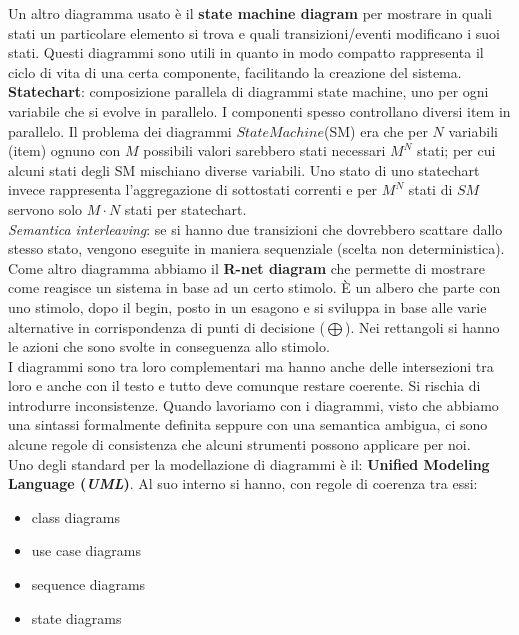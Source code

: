 Un altro diagramma usato è il \textbf{state machine diagram} per mostrare in quali stati un particolare elemento si trova e quali transizioni/eventi modificano i suoi stati. Questi diagrammi sono utili in quanto in modo compatto rappresenta il ciclo di vita di una certa componente, facilitando la creazione del sistema. \\

\textbf{Statechart}: composizione parallela di diagrammi state machine, uno per ogni variabile che si evolve in parallelo. I componenti spesso controllano diversi item in parallelo. Il problema dei diagrammi $StateMachine$(SM) era che per $N$ variabili (item) ognuno con $M$ possibili valori sarebbero stati necessari $M^N$ stati; per cui alcuni stati degli SM mischiano diverse variabili. Uno stato di uno statechart invece rappresenta l’aggregazione di sottostati correnti e per $M^N$ stati di $SM$ servono solo $M \cdot N$ stati per statechart.\\
\textit{Semantica interleaving}: se si hanno due transizioni che dovrebbero scattare dallo stesso stato, vengono eseguite in maniera sequenziale (scelta non deterministica).\\

Come altro diagramma abbiamo il \textbf{R-net diagram} che permette di mostrare come reagisce un sistema in base ad un certo stimolo. È un albero che parte con uno stimolo, dopo il begin, posto in un esagono e si sviluppa in base alle varie alternative in corrispondenza di punti di decisione ($\bigoplus$). Nei rettangoli si hanno le azioni che sono svolte in conseguenza allo stimolo.\\

I diagrammi sono tra loro complementari ma hanno anche delle intersezioni tra loro e anche con il testo e tutto deve comunque restare coerente. Si rischia di introdurre inconsistenze. Quando lavoriamo con i diagrammi, visto che abbiamo una sintassi formalmente definita seppure con una semantica ambigua, ci sono alcune regole di consistenza che alcuni strumenti possono applicare per noi.\\

Uno degli standard per la modellazione di diagrammi è il: \textbf{Unified Modeling Language (\textit{UML})}. Al suo interno si hanno, con regole di coerenza tra essi:
\begin{itemize}
  \item class diagrams
  \item use case diagrams
  \item sequence diagrams
  \item state diagrams
\end{itemize}

